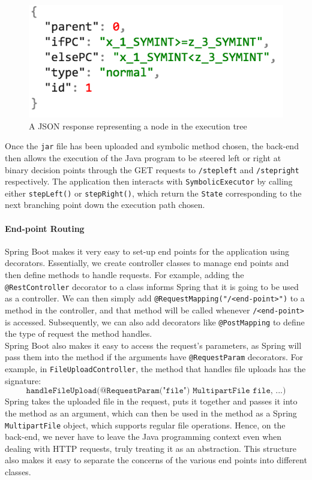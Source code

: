\documentclass[titlepage,11pt]{article}
\begin{document}
\begin{figure}
\centering
\includegraphics[scale=0.7]{statejson.png}
\caption{A JSON response representing a node in the execution tree}
\label{fig:statejson}
\end{figure}

Once the \texttt{jar} file has been uploaded and symbolic method chosen, the back-end then allows the execution of the Java program to be steered left or right at binary decision points through the GET requests to \texttt{/stepleft} and \texttt{/stepright} respectively. The application then interacts with \texttt{SymbolicExecutor} by calling either \texttt{stepLeft()} or \texttt{stepRight()}, which return the \texttt{State} corresponding to the next branching point down the execution path chosen. \\

\paragraph{End-point Routing}

Spring Boot makes it very easy to set-up end points for the application using decorators. Essentially, we create controller classes to manage end points and then define methods to handle requests. For example, adding the \texttt{@RestController} decorator to a class informs Spring that it is going to be used as a controller. We can then simply add \texttt{@RequestMapping("/<end-point>")} to a method in the controller, and that method will be called whenever \texttt{/<end-point>} is accessed. Subsequently, we can also add decorators like \texttt{@PostMapping} to define the type of request the method handles. \\

Spring Boot also makes it easy to access the request's parameters, as Spring will pass them into the method if the arguments have \texttt{@RequestParam} decorators. For example, in \texttt{FileUploadController}, the method that handles file uploads has the signature:  
\[ \texttt{handleFileUpload(@RequestParam("file") MultipartFile file, ...)} \]
Spring takes the uploaded file in the request, puts it together and passes it into the method as an argument, which can then be used in the method as a Spring \texttt{MultipartFile} object, which supports regular file operations. Hence, on the back-end, we never have to leave the Java programming context even when dealing with HTTP requests, truly treating it as an abstraction. This structure also makes it easy to separate the concerns of the various end points into different classes. 
\end{document}
